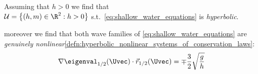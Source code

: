 \begin{examplebox}
\begin{example}
        \begin{itemizenosep}
        \item Assuming that $h>0$ we find that\\ $\admissibleset=\left\{(h,m)\in\R^{2}:h>0\right\}$ s.t.\ \cref{eq:shallow_water_equations}
        is \textit{hyperbolic}.
        \item moreover we find that both wave families of \cref{eq:shallow_water_equations} are \textit{genuinely nonlinear}\cref{defn:hyperbolic_nonlinear_systems_of_conservation_laws}:
        \begin{align*}
          \nabla\eigenval_{1/2}(\Uvec)\cdot\vec{r}_{1/2}(\Uvec)=\mp\frac{3}{2}\sqrt{\frac{g}{h}}
        \end{align*}
        \end{itemizenosep}
    \end{example}
\end{examplebox}
